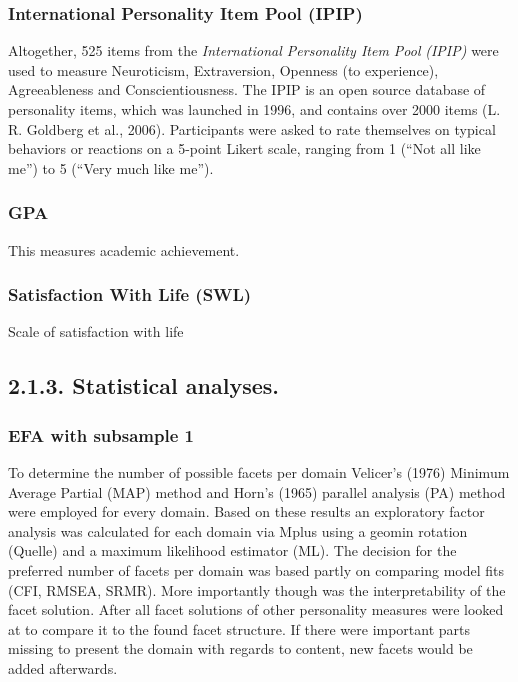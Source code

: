 \documentclass[,man]{apa6}
\theoremstyle{definition}
\theoremstyle{definition}
\theoremstyle{definition}
\theoremstyle{remark}
\begin{document}
\hypertarget{international-personality-item-pool-ipip}{%
\subsubsection{International Personality Item Pool
(IPIP)}\label{international-personality-item-pool-ipip}}

Altogether, 525 items from the \emph{International Personality Item
Pool} \emph{(IPIP)} were used to measure Neuroticism, Extraversion,
Openness (to experience), Agreeableness and Conscientiousness. The IPIP
is an open source database of personality items, which was launched in
1996, and contains over 2000 items (L. R. Goldberg et al., 2006).
Participants were asked to rate themselves on typical behaviors or
reactions on a 5-point Likert scale, ranging from 1 (\enquote{Not all
like me}) to 5 (\enquote{Very much like me}).

\hypertarget{gpa}{%
\subsubsection{GPA}\label{gpa}}

This measures academic achievement.

\hypertarget{satisfaction-with-life-swl}{%
\subsubsection{Satisfaction With Life
(SWL)}\label{satisfaction-with-life-swl}}

Scale of satisfaction with life

\hypertarget{statistical-analyses.}{%
\subsection{2.1.3. Statistical analyses.}\label{statistical-analyses.}}

\hypertarget{efa-with-subsample-1}{%
\subsubsection{EFA with subsample 1}\label{efa-with-subsample-1}}

To determine the number of possible facets per domain Velicer's (1976)
Minimum Average Partial (MAP) method and Horn's (1965) parallel analysis
(PA) method were employed for every domain. Based on these results an
exploratory factor analysis was calculated for each domain via Mplus
using a geomin rotation (Quelle) and a maximum likelihood estimator
(ML). The decision for the preferred number of facets per domain was
based partly on comparing model fits (CFI, RMSEA, SRMR). More
importantly though was the interpretability of the facet solution. After
all facet solutions of other personality measures were looked at to
compare it to the found facet structure. If there were important parts
missing to present the domain with regards to content, new facets would
be added afterwards.
\end{document}

